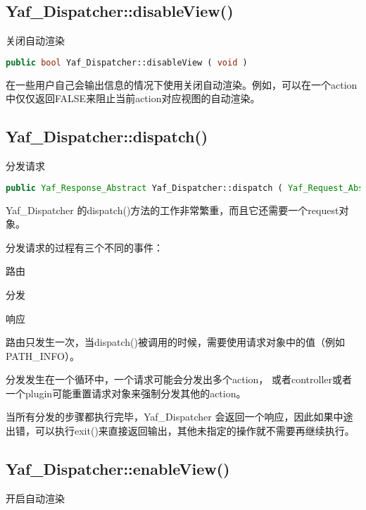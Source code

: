 \subsection{Yaf\_Dispatcher::disableView()}

关闭自动渲染


\begin{lstlisting}[language=PHP]
public bool Yaf_Dispatcher::disableView ( void )
\end{lstlisting}

在一些用户自己会输出信息的情况下使用关闭自动渲染。例如，可以在一个action中仅仅返回FALSE来阻止当前action对应视图的自动渲染。


\subsection{Yaf\_Dispatcher::dispatch()}

分发请求


\begin{lstlisting}[language=PHP]
public Yaf_Response_Abstract Yaf_Dispatcher::dispatch ( Yaf_Request_Abstract $request )
\end{lstlisting}

Yaf\_Dispatcher 的dispatch()方法的工作非常繁重，而且它还需要一个request对象。

分发请求的过程有三个不同的事件：

\begin{compactitem}
\item 路由
\item 分发
\item 响应
\end{compactitem}

路由只发生一次，当dispatch()被调用的时候，需要使用请求对象中的值（例如PATH\_INFO）。

分发发生在一个循环中，一个请求可能会分发出多个action， 或者controller或者一个plugin可能重置请求对象来强制分发其他的action。 

当所有分发的步骤都执行完毕，Yaf\_Dispatcher 会返回一个响应，因此如果中途出错，可以执行exit()来直接返回输出，其他未指定的操作就不需要再继续执行。





\subsection{Yaf\_Dispatcher::enableView()}

开启自动渲染


